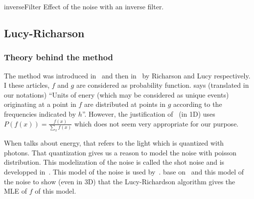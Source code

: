 \begin{myfig}{inverseFilter}
  {Effect of the noise with an inverse filter.}
\end{myfig}


\subsection{Lucy-Richarson}
\label{subsec:Lucy}
\subsubsection{Theory behind the method}
The method was introduced in~\cite{richardson1972bayesian} and
then in~\cite{lucy1974iterative} by Richarson and Lucy respectively.
I these articles, $f$ and $g$ are considered as probability function.
\cite{richardson1972bayesian} says (translated in our notations)
``Units of enery (which may be considered as unique events)
originating at a point in $f$ are distributed at points in $g$
according to the frequencies indicated by $h$''.
However, the justification of~\cite{richardson1972bayesian} (in 1D) uses
$P(f(x)) = \frac{f(x)}{\sum_x f(x)}$ which does not seem
very appropriate for our purpose.

When \cite{richardson1972bayesian} talks about energy,
that refers to the light which is quantized with photons.
That quantization gives us a reason to model the noise with
poisson distribution.
This modelization of the noise is called the shot noise and
is developped in~\cite{blanter2000shot}.
This model of the noise is used by~\cite{hebert1989generalized}.
\cite{temerinac2010tile} base on~\cite{hebert1989generalized}
and this model of the noise to show (even in 3D)
that the Lucy-Richardson algorithm gives the MLE of $f$ of this
model.

